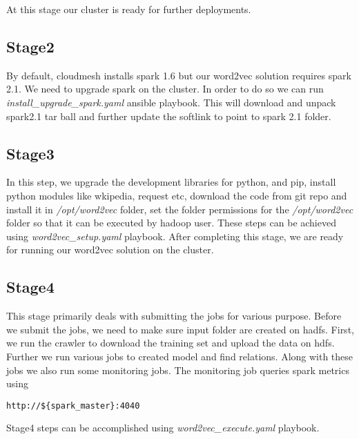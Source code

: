 At this stage our cluster is ready for further deployments.

\subsection{Stage2} \label{deploymentstage2}  
By default, cloudmesh installs spark 1.6 but our word2vec solution requires
spark 2.1. We need to upgrade spark on the cluster. In order to do so we can run 
\textit{install\_upgrade\_spark.yaml} ansible\cite{www-ansible} playbook. This will download and unpack spark2.1 
tar ball and further update the softlink to point to spark 2.1 folder.

\subsection{Stage3} \label{deploymentstage3} 
In this step, we upgrade the development libraries for python, and pip,
install python modules like wkipedia, request etc, download the code from git repo and
install it in \textit{/opt/word2vec} folder, set the folder permissions for the \textit{/opt/word2vec} folder
so that it can be executed by hadoop user. These steps can be achieved using 
\textit{word2vec\_setup.yaml} playbook. After completing this stage, we are ready for running
our word2vec solution on the cluster. 

\subsection{Stage4} \label{deploymentstage4} 
This stage primarily deals with submitting the jobs for various purpose. 
Before we submit the jobs, we need to make sure input folder are created on hadfs.
First, we run the crawler to download the training set and upload the data on hdfs.
Further we run various jobs to created model and find relations. Along with these jobs
we also run some monitoring jobs. The monitoring job queries spark metrics using 
\begin{verbatim}
http://${spark_master}:4040
\end{verbatim}

Stage4 steps can be accomplished using \textit{word2vec\_execute.yaml} playbook. 

